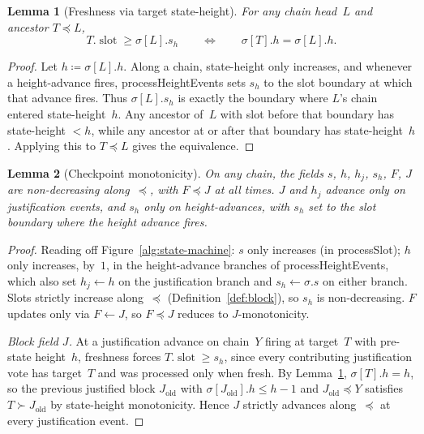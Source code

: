 \ifx\litemode\undefined\documentclass{article}\fi
\newcommand{\slot}[0]{\ensuremath{\operatorname{\mathrm{slot}}}}
\newcommand{\processSlot}{\textsf{processSlot}\xspace}
\newcommand{\processHeightEvents}{\textsf{processHeightEvents}\xspace}
\theoremstyle{plain}
\newtheorem{lemma}{Lemma}
\theoremstyle{definition}
\theoremstyle{remark}
\begin{document}
\begin{lemma}[Freshness via target state-height]\label{lem:fresh-equiv}
For any chain head~$L$ and ancestor $T \preceq L$,
\[
  T.\slot \geq \sigma[L].s_h
  \qquad\Longleftrightarrow\qquad
  \sigma[T].h = \sigma[L].h .
\]
\end{lemma}

\begin{proof}
Let $h \coloneqq \sigma[L].h$.
Along a chain, state-height only increases, and whenever a height-advance fires, \processHeightEvents sets $s_h$ to the slot boundary at which that advance fires.
Thus $\sigma[L].s_h$ is exactly the boundary where $L$'s chain entered state-height~$h$.
Any ancestor of~$L$ with slot before that boundary has state-height $< h$, while any ancestor at or after that boundary has state-height~$h$.
Applying this to $T \preceq L$ gives the equivalence.
\end{proof}

\begin{lemma}[Checkpoint monotonicity]\label{lem:slotmono}
On any chain, the fields $s$, $h$, $h_j$, $s_h$, $F$, $J$ are non-decreasing along~$\preceq$, with $F \preceq J$ at all times.
$J$ and $h_j$ advance only on justification events, and $s_h$ only on height-advances, with $s_h$ set to the slot boundary where the height advance fires.
\end{lemma}

\begin{proof}
Reading off Figure~\ref{alg:state-machine}: $s$ only increases (in \processSlot); $h$ only increases, by~$1$, in the height-advance branches of \processHeightEvents, which also set $h_j \gets h$ on the justification branch and $s_h \gets \sigma.s$ on either branch.
Slots strictly increase along~$\preceq$ (Definition~\ref{def:block}), so $s_h$ is non-decreasing.
$F$ updates only via $F \gets J$, so $F \preceq J$ reduces to $J$-monotonicity.

\emph{Block field $J$.}
At a justification advance on chain~$Y$ firing at target~$T$ with pre-state height~$h$, freshness forces $T.\slot \geq s_h$, since every contributing justification vote has target~$T$ and was processed only when fresh.
By Lemma~\ref{lem:fresh-equiv}, $\sigma[T].h = h$, so the previous justified block $J_{\mathrm{old}}$ with $\sigma[J_{\mathrm{old}}].h \leq h-1$ and $J_{\mathrm{old}} \preceq Y$ satisfies $T \succ J_{\mathrm{old}}$ by state-height monotonicity.
Hence $J$ strictly advances along~$\preceq$ at every justification event.
\end{proof}
\end{document}
